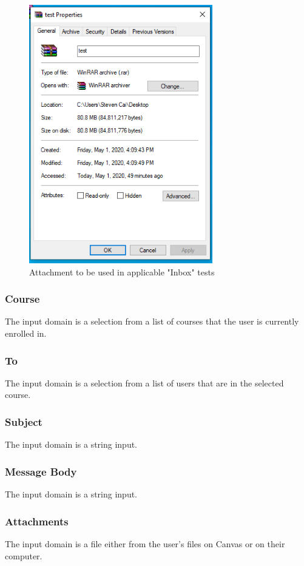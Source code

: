 \documentclass[10pt,letterpaper]{article}
\begin{document}
\begin{figure}[h!]
	\centerline{\includegraphics[width=8cm]{screenshots/compose-message-attachment.png}}
	\caption{Attachment to be used in applicable "Inbox" tests}
\end{figure}

\subsubsection{Course}
The input domain is a selection from a list of courses that the user is currently enrolled in.

\subsubsection{To}
The input domain is a selection from a list of users that are in the selected course.

\subsubsection{Subject}
The input domain is a string input.

\subsubsection{Message Body}
The input domain is a string input.

\subsubsection{Attachments}
The input domain is a file either from the user’s files on Canvas or on their computer.
\end{document}

